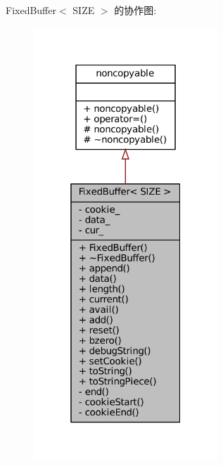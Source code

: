 Fixed\+Buffer$<$ S\+I\+ZE $>$ 的协作图\+:
\nopagebreak
\begin{figure}[H]
\begin{center}
\leavevmode
\includegraphics[width=196pt]{classmuduo_1_1detail_1_1FixedBuffer__coll__graph}
\end{center}
\end{figure}
